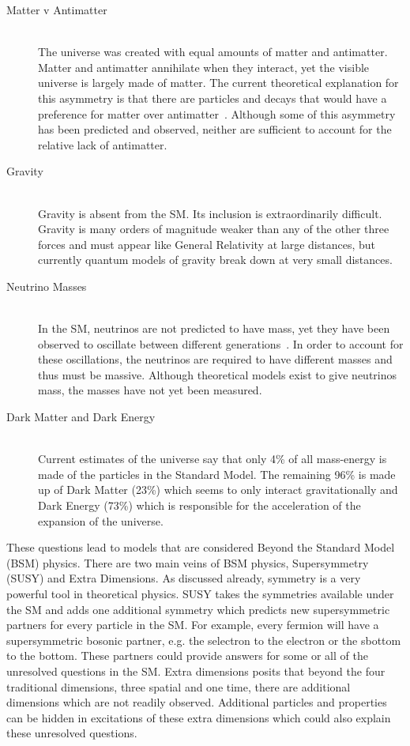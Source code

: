 \begin{description}
\item[Matter v Antimatter] \hfill \\
The universe was created with equal amounts of matter and antimatter. Matter and antimatter annihilate when they interact, yet the visible universe is largely made of matter. The current theoretical explanation for this asymmetry is that there are particles and decays that would have a preference for matter over antimatter~\cite{Sakharov:1967dj}. Although some of this asymmetry has been predicted and observed, neither are sufficient to account for the relative lack of antimatter.
\item[Gravity] \hfill \\
Gravity is absent from the SM. Its inclusion is extraordinarily difficult. Gravity is many orders of magnitude weaker than any of the other three forces and must appear like General Relativity at large distances, but currently quantum models of gravity break down at very small distances.
\item[Neutrino Masses] \hfill \\
In the SM, neutrinos are not predicted to have mass, yet they have been observed to oscillate between different generations~\cite{Fukuda:1998mi}. In order to account for these oscillations, the neutrinos are required to have different masses and thus must be massive. Although theoretical models exist to give neutrinos mass, the masses have not yet been measured.
\item[Dark Matter and Dark Energy] \hfill \\
Current estimates of the universe say that only 4\% of all mass-energy is made of the particles in the Standard Model. The remaining 96\% is made up of Dark Matter (23\%) which seems to only interact gravitationally and Dark Energy (73\%) which is responsible for the acceleration of the expansion of the universe.
\end{description}

These questions lead to models that are considered Beyond the Standard Model (BSM) physics. There are two main veins of BSM physics, Supersymmetry (SUSY) and Extra Dimensions. As discussed already, symmetry is a very powerful tool in theoretical physics. SUSY takes the symmetries available under the SM and adds one additional symmetry which predicts new supersymmetric partners for every particle in the SM. For example, every fermion will have a supersymmetric bosonic partner, e.g. the selectron to the electron or the sbottom to the bottom. These partners could provide answers for some or all of the unresolved questions in the SM. Extra dimensions posits that beyond the four traditional dimensions, three spatial and one time, there are additional dimensions which are not readily observed. Additional particles and properties can be hidden in excitations of these extra dimensions which could also explain these unresolved questions.


